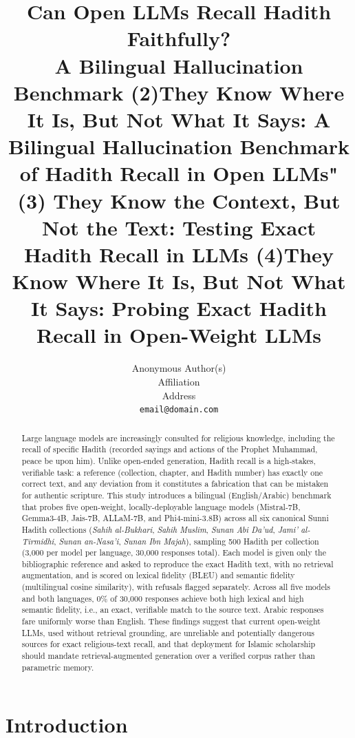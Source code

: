 \documentclass{article}
\title{Can Open LLMs Recall Hadith Faithfully?\\A Bilingual Hallucination Benchmark (2)They Know Where It Is, But Not What It Says: A Bilingual Hallucination Benchmark of Hadith Recall in Open LLMs" (3) They Know the Context, But Not the Text: Testing Exact Hadith Recall in LLMs (4)They Know Where It Is, But Not What It Says: Probing Exact Hadith Recall in Open-Weight LLMs}
\author{%
  Anonymous Author(s) \\
  Affiliation \\
  Address \\
  \texttt{email@domain.com} \\
}
\begin{document}
\maketitle

  \begin{abstract}
  Large language models are increasingly consulted for religious knowledge,
  including the recall of specific Hadith (recorded sayings and actions of the
  Prophet Muhammad, peace be upon him). Unlike open-ended generation, Hadith
  recall is a high-stakes, verifiable task: a reference (collection, chapter,
  and Hadith number) has exactly one correct text, and any deviation from it
  constitutes a fabrication that can be mistaken for authentic scripture. This
  study introduces a bilingual (English/Arabic) benchmark that probes five open-weight,
  locally-deployable language models (Mistral-7B, Gemma3-4B, Jais-7B, ALLaM-7B,
  and Phi4-mini-3.8B) across all six canonical Sunni Hadith collections
  (\emph{Sahih al-Bukhari}, \emph{Sahih Muslim}, \emph{Sunan Abi Da'ud},
  \emph{Jami' al-Tirmidhi}, \emph{Sunan an-Nasa'i}, \emph{Sunan Ibn Majah}),
  sampling 500 Hadith per collection (3,000 per model per language, 30,000
  responses total). Each model is given only the bibliographic reference and asked to reproduce
  the exact Hadith text, with no retrieval augmentation, and is scored on
  lexical fidelity (BLEU) and semantic fidelity (multilingual cosine
  similarity), with refusals flagged separately. Across all five models and
  both languages, 0\% of 30,000 responses achieve both high lexical and high
  semantic fidelity, i.e., an exact, verifiable match to the source text.
  Arabic responses fare uniformly worse than English. These findings suggest that
  current open-weight LLMs, used without retrieval grounding, are unreliable
  and potentially dangerous sources for exact religious-text recall, and that
  deployment for Islamic scholarship should mandate retrieval-augmented
  generation over a verified corpus rather than parametric memory.
  \end{abstract}

\section{Introduction}
\label{sec:intro}
\end{document}
